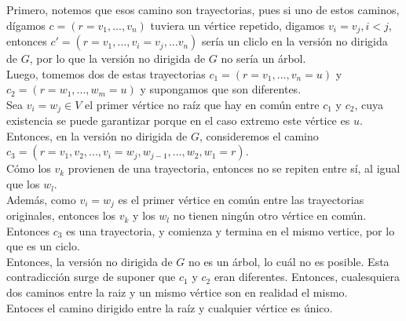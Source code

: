 \documentclass[12pt,a4paper]{report}
\begin{document}
\begin{enumerate}
{			Primero, notemos que esos camino son trayectorias, pues si uno de estos
			caminos, dígamos $c = (r = v_1, ..., v_n)$ tuviera un vértice repetido,
			digamos $v_i = v_j, i < j$, entonces $c' = (r = v_1, ..., v_i = v_j, ... v_n)$
			sería un cliclo en la versión no dirigida de $G$, por lo que la versión
			no dirigida de $G$ no sería un árbol.\\

			Luego, tomemos dos de estas trayectorias $c_1 = (r = v_1, ..., v_n = u)$ y
			$c_2 = (r = w_1, ..., w_m = u)$ y supongamos que son diferentes.\\
			Sea $v_i = w_j \in V$ el primer vértice no raíz que hay en común entre
			$c_1$ y $c_2$, cuya existencia se puede garantizar porque en el caso
			extremo este vértice es $u$.\\
			Entonces, en la versión no dirigida de $G$, consideremos el camino
			$c_3 = (r = v_1, v_2, ..., v_i = w_j, w_{j-1}, ..., w_2, w_1 = r)$.\\
			Cómo los $v_k$ provienen de una trayectoria, entonces no se repiten entre
			sí, al igual que los $w_l$.\\
			Además, como $v_i = w_j$ es el primer vértice en común entre las
			trayectorias originales, entonces los $v_k$ y  los $w_l$ no tienen ningún
			otro vértice en común.
			Entonces $c_3$ es una trayectoria, y comienza  y termina en el mismo
			vertice, por lo que es un ciclo.\\
			Entonces, la versión no dirigida de $G$ no es un árbol, lo cuál no es
			posible. Esta contradicción surge de suponer que $c_1$ y $c_2$ eran
			diferentes. Entonces, cualesquiera dos caminos entre la raiz y un mismo
			vértice son en realidad el mismo.\\
			Entoces el camino dirigido entre la raíz y cualquier vértice es único.\\

}
\end{enumerate}
\end{document}
